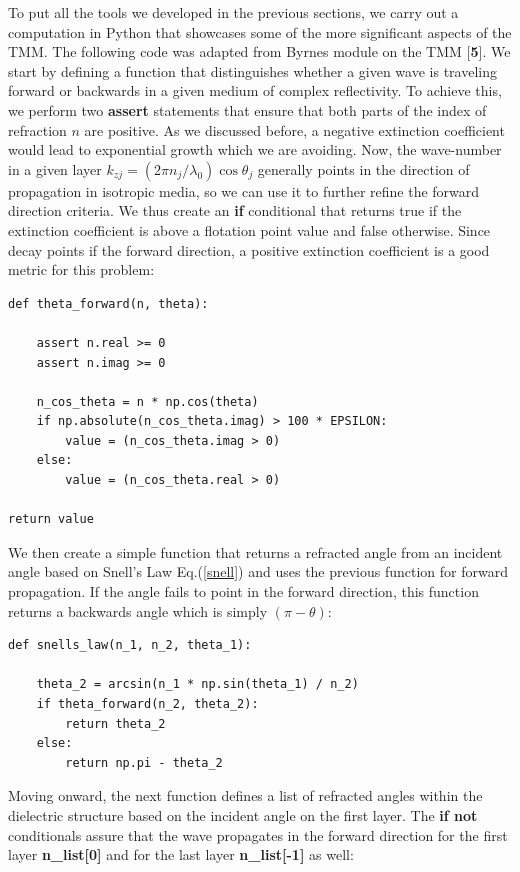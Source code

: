 \documentclass[preprint, onecolumn, amsmath, amssymb, aps]{revtex4-1}
\numberwithin{equation}{section}
\begin{document}
To put all the tools we developed in the previous sections, we carry out a computation in Python that showcases some of the more significant aspects of the TMM. The following code was adapted from Byrnes module on the TMM [\textbf{5}]. We start by defining a function that distinguishes whether a given wave is traveling forward or backwards in a given medium of complex reflectivity. To achieve this, we perform two \textbf{assert} statements that ensure that both parts of the index of refraction $n$ are positive. As we discussed before, a negative extinction coefficient would lead to exponential growth which we are avoiding. Now, the wave-number in a given layer $k_{z j} = (2 \pi n_{j} / \lambda_{0}) \cos \theta_{j}$ generally points in the direction of propagation in isotropic media, so we can use it to further refine the forward direction criteria. We thus create an \textbf{if} conditional that returns true if the extinction coefficient is above a flotation point value and false otherwise. Since decay points if the forward direction, a positive extinction coefficient is a good metric for this problem:
\lstset{showspaces=false,showstringspaces=false}%
\begin{lstlisting}
def theta_forward(n, theta):

	assert n.real >= 0
	assert n.imag >= 0

	n_cos_theta = n * np.cos(theta)    
	if np.absolute(n_cos_theta.imag) > 100 * EPSILON:
		value = (n_cos_theta.imag > 0)
	else:
		value = (n_cos_theta.real > 0)

return value
\end{lstlisting}
\noindent
We then create a simple function that returns a refracted angle from an incident angle based on Snell's Law Eq.(\ref{snell}) and uses the previous function for forward propagation. If the angle fails to point in the forward direction, this function returns a backwards angle which is simply $(\pi - \theta)$:
\lstset{showspaces=false,showstringspaces=false}%
\begin{lstlisting}
def snells_law(n_1, n_2, theta_1):

	theta_2 = arcsin(n_1 * np.sin(theta_1) / n_2)
	if theta_forward(n_2, theta_2):
		return theta_2
	else:
		return np.pi - theta_2
\end{lstlisting}
\noindent
Moving onward, the next function defines a list of refracted angles within the dielectric structure based on the incident angle on the first layer. The \textbf{if not} conditionals assure that the wave propagates in the forward direction for the first layer \textbf{n\_list[0]} and for the last layer \textbf{n\_list[-1]} as well:
\end{document}
